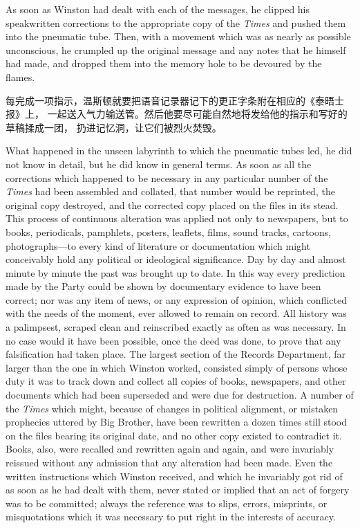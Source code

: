 \begin{paracol}{2}
\switchcolumn*

As soon as Winston had dealt with each of the messages, he clipped his
speakwritten corrections to the appropriate copy of the \emph{Times} and
pushed them into the pneumatic tube. Then, with a movement which was as
nearly as possible unconscious, he crumpled up the original message and
any notes that he himself had made, and dropped them into the memory
hole to be devoured by the flames.

\switchcolumn

每完成一项指示，温斯顿就要把语音记录器记下的更正字条附在相应的《泰晤士报》上，
一起送入气力输送管。然后他要尽可能自然地将发给他的指示和写好的草稿揉成一团，
扔进记忆洞，让它们被烈火焚毁。

\switchcolumn*

What happened in the unseen labyrinth to which the pneumatic tubes led,
he did not know in detail, but he did know in general terms. As soon as
all the corrections which happened to be necessary in any particular
number of the \emph{Times} had been assembled and collated, that number
would be reprinted, the original copy destroyed, and the corrected copy
placed on the files in its stead. This process of continuous alteration
was applied not only to newspapers, but to books, periodicals,
pamphlets, posters, leaflets, films, sound tracks, cartoons,
photographs---to every kind of literature or documentation which might
conceivably hold any political or ideological significance. Day by day
and almost minute by minute the past was brought up to date. In this way
every prediction made by the Party could be shown by documentary
evidence to have been correct; nor was any item of news, or any
expression of opinion, which conflicted with the needs of the moment,
ever allowed to remain on record. All history was a palimpsest, scraped
clean and reinscribed exactly as often as was necessary. In no case
would it have been possible, once the deed was done, to prove that any
falsification had taken place. The largest section of the Records
Department, far larger than the one in which Winston worked, consisted
simply of persons whose duty it was to track down and collect all copies
of books, newspapers, and other documents which had been superseded and
were due for destruction. A number of the \emph{Times} which might,
because of changes in political alignment, or mistaken prophecies
uttered by Big Brother, have been rewritten a dozen times still stood on
the files bearing its original date, and no other copy existed to
contradict it. Books, also, were recalled and rewritten again and again,
and were invariably reissued without any admission that any alteration
had been made. Even the written instructions which Winston received, and
which he invariably got rid of as soon as he had dealt with them, never
stated or implied that an act of forgery was to be committed; always the
reference was to slips, errors, misprints, or misquotations which it was
necessary to put right in the interests of accuracy.


\end{paracol}
